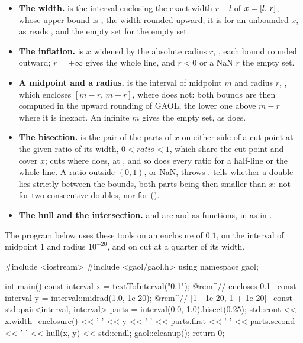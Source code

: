 \documentclass[12pt,a4paper,twoside,openright]{book}
\begin{document}
\begin{itemize}
\item[$\bullet$] \textbf{The width.}  is the
  interval  enclosing the exact width $r-l$ of
  $x=[l,\,r]$, whose upper bound is , the width rounded
  upward; it is  for an unbounded $x$, as
   reads , and the empty set for the empty
  set.
\item[$\bullet$] \textbf{The inflation.}  is $x$ widened by
  the absolute radius $r$, , each bound rounded
  outward; $r=+\infty$ gives the whole line, and $r<0$ or a NaN $r$ the empty
  set.
\item[$\bullet$] \textbf{A midpoint and a radius.} 
  is the interval of midpoint $m$ and radius $r$,
  , which encloses $[m-r,\,m+r]$, where
   does not: both bounds are then computed in the
  upward rounding of GAOL, the lower one above $m-r$ where it is inexact. An
  infinite $m$ gives the empty set, as  does.
\item[$\bullet$] \textbf{The bisection.}  is the pair of
  the parts of $x$ on either side of a cut point at the given ratio of its
  width, $0<\mathit{ratio}<1$, which share the cut point and cover $x$;
   cuts where  does, at , and
  so does every ratio for a half-line or the whole line. A ratio outside
  $(0,1)$, or NaN, throws . 
  tells whether a double lies strictly between the bounds, both parts being
  then smaller than $x$: not for two consecutive doubles, nor for
   ().
\item[$\bullet$] \textbf{The hull and the intersection.}  and
   are  and  as functions, in
   as in .
\end{itemize}

\begin{Ex}\label{ex:tools}
The program below uses these tools on an enclosure of $0.1$, on the interval
of midpoint $1$ and radius $10^{-20}$, and on  cut at a quarter of
its width.
\begin{example}
#include <iostream>
#include <gaol/gaol.h>
using namespace gaol;

int main()
{
  const interval x = textToInterval("0.1");        @rem^// encloses 0.1~
  const interval y = interval::midrad(1.0, 1e-20); @rem^// [1 - 1e-20, 1 + 1e-20]~
  const std::pair<interval, interval> parts = interval(0.0, 1.0).bisect(0.25);
  std::cout << x.width_enclosure() << ' ' << y << ' ' << parts.first << ' '
            << parts.second << ' ' << hull(x, y) << std::endl;
  gaol::cleanup();
  return 0;
}
\end{example}
\end{Ex}
\end{document}
